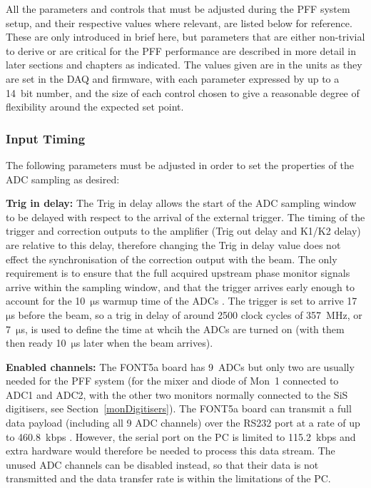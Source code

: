 All the parameters and controls that must be adjusted during the PFF system setup, and their respective values where relevant, are listed below for reference. These are only introduced in brief here, but parameters that are either non-trivial to derive or are critical for the PFF performance are described in more detail in later sections and chapters as indicated. The values given are in the units as they are set in the DAQ and firmware, with each parameter expressed by up to a 14~bit number, and the size of each control chosen to give a reasonable degree of flexibility around the expected set point. 

\subsubsection{Input Timing}

The following parameters must be adjusted in order to set the properties of the ADC sampling as desired:

\textbf{Trig in delay:} The Trig in delay allows the start of the ADC sampling window to be delayed with respect to the arrival of the external trigger. The timing of the trigger and correction outputs to the amplifier (Trig out delay and K1/K2 delay) are relative to this delay, therefore changing the Trig in delay value does not effect the synchronisation of the correction output with the beam. The only requirement is to ensure that the full acquired upstream phase monitor signals arrive within the sampling window, and that the trigger arrives early enough to account for the 10~\(\mathrm{\mu}\)s warmup time of the ADCs \cite{glennPriv}. The trigger is set to arrive 17~\(\mathrm{\mu}\)s before the beam, so a trig in delay of around 2500 clock cycles of 357~MHz, or 7~\(\mathrm{\mu}\)s, is used to define the time at whcih the ADCs are turned on (with them then ready 10~\(\mathrm{\mu}\)s later when the beam arrives).

\textbf{Enabled channels:} The FONT5a board has 9~ADCs but only two are usually needed for the PFF system (for the mixer and diode of Mon~1 connected to ADC1 and ADC2, with the other two monitors normally connected to the SiS digitisers, see Section~\ref{monDigitisers}). 
The FONT5a board can transmit a full data payload (including all 9 ADC channels) over the RS232 port at a rate of up to 460.8~kbps \cite{glennPriv}. However, the serial port on the PC is limited to 115.2~kbps and extra hardware would therefore be needed to process this data stream.
The unused ADC channels can be disabled instead, so that their data is not transmitted and the data transfer rate is within the limitations of the PC.

